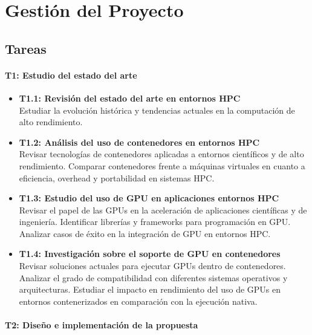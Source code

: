 \chapter{Gestión del Proyecto}\label{cap:gestion_proyecto}

\section{Tareas}\label{sec:tareas}

\subsubsection{T1: Estudio del estado del arte}\label{subsubsec:tareas_ob1}

\begin{itemize}[noitemsep]
      \item \textbf{T1.1: Revisión del estado del arte en entornos HPC} \\
            Estudiar la evolución histórica y tendencias actuales en la computación de alto rendimiento.

      \item \textbf{T1.2: Análisis del uso de contenedores en entornos HPC} \\
            Revisar tecnologías de contenedores aplicadas a entornos científicos y de alto rendimiento. Comparar contenedores frente a máquinas virtuales en cuanto a eficiencia, overhead y portabilidad en sistemas HPC.

      \item \textbf{T1.3: Estudio del uso de GPU en aplicaciones entornos HPC} \\
            Revisar el papel de las GPUs en la aceleración de aplicaciones científicas y de ingeniería. Identificar librerías y frameworks para programación en GPU. Analizar casos de éxito en la integración de GPU en entornos HPC.

      \item \textbf{T1.4: Investigación sobre el soporte de GPU en contenedores} \\
            Revisar soluciones actuales para ejecutar GPUs dentro de contenedores. Analizar el grado de compatibilidad con diferentes sistemas operativos y arquitecturas. Estudiar el impacto en rendimiento del uso de GPUs en entornos contenerizados en comparación con la ejecución nativa.
\end{itemize}

\subsubsection{T2: Diseño e implementación de la propuesta}\label{subsubsec:tareas_ob2}

